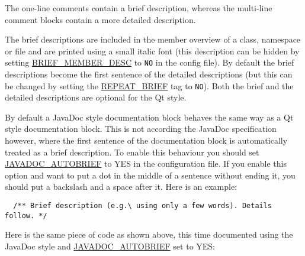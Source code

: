 The one-line comments contain a brief description, whereas the multi-line comment blocks contain a more detailed description.

The brief descriptions are included in the member overview of a class, namespace or file and are printed using a small italic font (this description can be hidden by setting \hyperlink{config_cfg_brief_member_desc}{BRIEF\_\-MEMBER\_\-DESC} to {\tt NO} in the config file). By default the brief descriptions become the first sentence of the detailed descriptions (but this can be changed by setting the \hyperlink{config_cfg_repeat_brief}{REPEAT\_\-BRIEF} tag to {\tt NO}). Both the brief and the detailed descriptions are optional for the Qt style.

By default a JavaDoc style documentation block behaves the same way as a Qt style documentation block. This is not according the JavaDoc specification however, where the first sentence of the documentation block is automatically treated as a brief description. To enable this behaviour you should set \hyperlink{config_cfg_javadoc_autobrief}{JAVADOC\_\-AUTOBRIEF} to YES in the configuration file. If you enable this option and want to put a dot in the middle of a sentence without ending it, you should put a backslash and a space after it. Here is an example: 

\footnotesize\begin{verbatim}
  /** Brief description (e.g.\ using only a few words). Details follow. */
\end{verbatim}
\normalsize


Here is the same piece of code as shown above, this time documented using the JavaDoc style and \hyperlink{config_cfg_javadoc_autobrief}{JAVADOC\_\-AUTOBRIEF} set to YES: 

